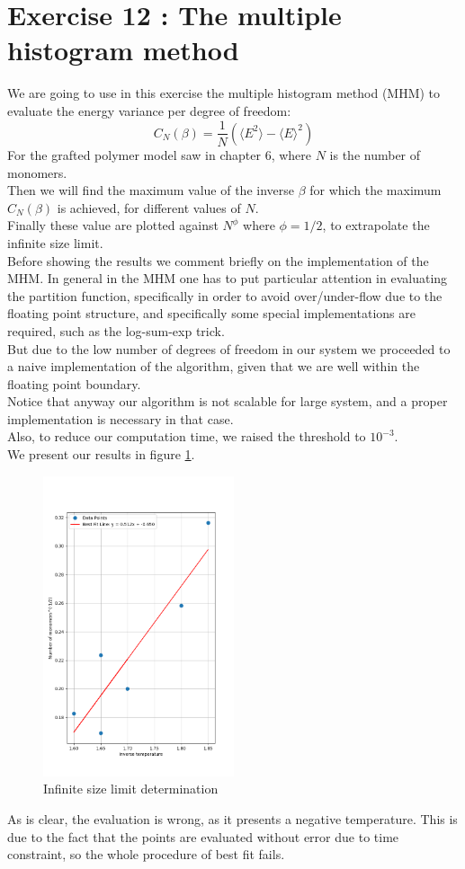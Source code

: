 \chapter*{Exercise 12 : The multiple histogram method}
We are going to use in this exercise the multiple histogram method (MHM) to evaluate the energy variance per degree of freedom:
$$C_N(\beta) = \frac{1}{N} (\langle E^2 \rangle -\langle E \rangle^2) $$ 
For the grafted polymer model saw in chapter 6, where $N$ is the number of monomers. \\
Then we will find the maximum value of the inverse $\beta$ for which the maximum $C_N(\beta)$ is achieved, for different values of $N$. \\
Finally these value are plotted against $N^\phi$ where $\phi = 1/2$, to extrapolate the infinite size limit. \\

Before showing the results we comment briefly on the implementation of the MHM. 
In general in the MHM one has to put particular attention in evaluating the partition function, specifically in order to avoid over/under-flow due to the 
floating point structure, and specifically some special implementations are required, such as the log-sum-exp trick. \\
But due to the low number of degrees of freedom in our system we proceeded to a naive implementation of the algorithm, given that we are well within the floating point boundary. \\
Notice that anyway our algorithm is not scalable for large system, and a proper implementation is necessary in that case. \\
Also, to reduce our computation time, we raised the threshold to $10^{-3}$. \\
We present our results in figure \ref{ex12:infinite_size}.

\begin{figure}[htp]
    \centering
    \includegraphics[width=0.5\textwidth]{FIG/ex12/infinite_size.png}
    \caption{Infinite size limit determination}
    \label{ex12:infinite_size}
\end{figure}

As is clear, the evaluation is wrong, as it presents a negative temperature. This is due to the fact that the points are evaluated without error due to time constraint, so the whole procedure of best fit fails. \\
